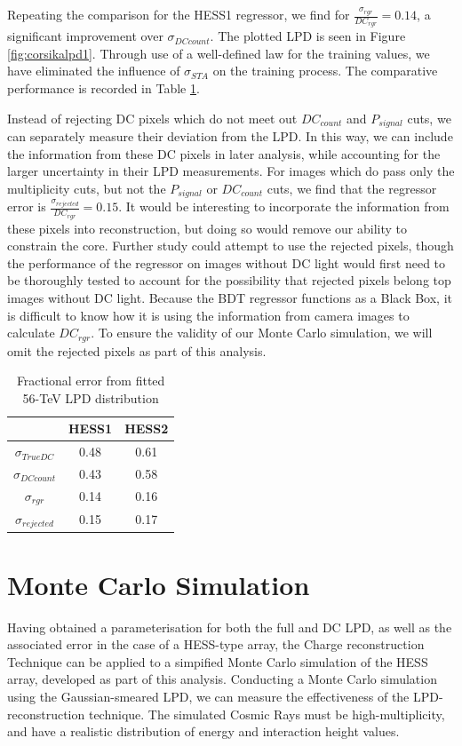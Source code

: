 \documentclass[11pt]{article}
\begin{document}
Repeating the comparison for the HESS1 regressor, we find for $\frac{\sigma_{rgr}}{DC_{rgr}} = 0.14$, a significant improvement over $\sigma_{DCcount}$. The plotted LPD is seen in Figure \ref{fig:corsikalpd1}. Through use of a well-defined law for the training values, we have eliminated the influence of $\sigma_{STA}$ on the training process. The comparative performance is recorded in Table \ref{tab:lpderror}.

Instead of rejecting DC pixels which do not meet out $DC_{count}$ and $P_{signal}$ cuts, we can separately measure their deviation from the LPD. In this way, we can include the information from these DC pixels in later analysis, while accounting for the larger uncertainty in their LPD measurements. For images which do pass only the multiplicity cuts, but not the $P_{signal}$ or $DC_{count}$ cuts, we find that the regressor error is $\frac{\sigma_{rejected}}{DC_{rgr}}=0.15$. It would be interesting to incorporate the information from these pixels into reconstruction, but doing so would remove our ability to constrain the core. Further study could attempt to use the rejected pixels, though the performance of the regressor on images without DC light would first need to be thoroughly tested to account for the possibility that rejected pixels belong top images without DC light. Because the BDT regressor functions as a Black Box, it is difficult to know how it is using the information from camera images to calculate $DC_{rgr}$. To ensure the validity of our Monte Carlo simulation, we will omit the rejected pixels as part of this analysis. 

\begin{table}[h!]
  \centering
  \caption{Fractional error from fitted 56-TeV LPD distribution}
  \label{tab:lpderror}
  \begin{tabular}{ccc}
    \toprule
    & HESS1 & HESS2\\
    \midrule
    $\sigma_{TrueDC}$ & 0.48 & 0.61\\
    $\sigma_{DCcount}$ & 0.43 & 0.58\\
    $\sigma_{rgr}$ & 0.14 & 0.16\\ 
    $\sigma_{rejected}$ & 0.15 & 0.17\\ 
    \bottomrule
  \end{tabular}
\end{table}

\section{Monte Carlo Simulation}
Having obtained a parameterisation for both the full and DC LPD, as well as the associated error in the case of a HESS-type array, the Charge reconstruction Technique can be applied to a simpified Monte Carlo simulation of the HESS array, developed as part of this analysis. Conducting a Monte Carlo simulation using the Gaussian-smeared LPD, we can measure the effectiveness of the LPD-reconstruction technique. The simulated Cosmic Rays must be high-multiplicity, and have a realistic distribution of energy and interaction height values.
\end{document}
